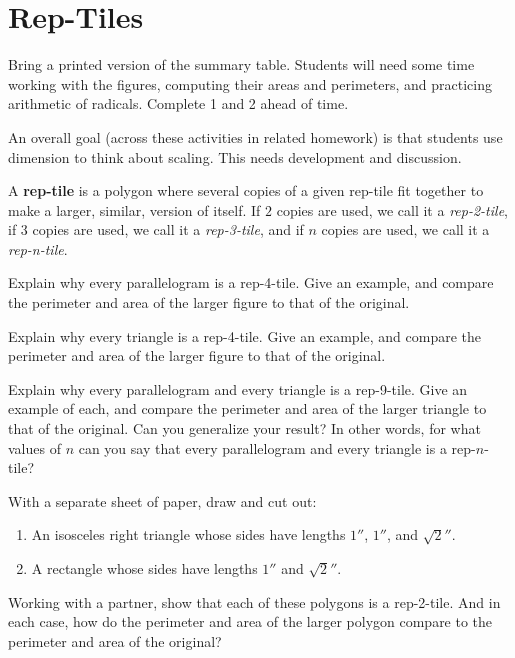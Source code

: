\newpage
\section{Rep-Tiles}
\begin{teachingnote}
Bring a printed version of the summary table.   Students will need some time working with the figures, computing their areas and perimeters, and practicing arithmetic of radicals.  Complete 1 and 2 ahead of time.  

An overall goal (across these activities in related homework) is that students use dimension to think about scaling. This needs development and discussion.  
\end{teachingnote}


A \textbf{rep-tile} is a polygon where several copies of
a given rep-tile fit together to make a larger, similar, version of
itself. If $2$ copies are used, we call it a \textit{rep-2-tile}, if
$3$ copies are used, we call it a \textit{rep-3-tile}, and if $n$ copies
are used, we call it a \textit{rep-n-tile}.

\begin{prob}
Explain why every parallelogram is a rep-4-tile. Give an example, and compare the perimeter and area of the larger figure to that of the original.
\end{prob}

\begin{prob}
Explain why every triangle is a rep-4-tile. Give an example, and compare the perimeter and area of the larger figure to that of the
original.
\end{prob}

\begin{prob}
Explain why every parallelogram and every triangle is a rep-9-tile. Give an example of each, and compare the perimeter and area of the larger triangle to that of the original. Can you generalize your result?  In other words, for what values of $n$ can you say that every parallelogram and every triangle is a rep-$n$-tile?  
\end{prob}

\begin{prob}
With a separate sheet of paper, draw and cut out:
\begin{enumerate}
\item An isosceles right triangle whose sides have lengths $1''$, $1''$, and $\sqrt{2}''$.
\item A rectangle whose sides have lengths $1''$ and $\sqrt{2}''$.
\end{enumerate}
Working with a partner, show that each of these polygons is a rep-2-tile.  And in each case,
how do the perimeter and area of the larger polygon compare to the perimeter and area of the original?
\end{prob}

